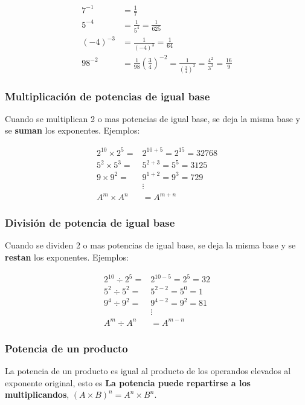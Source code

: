 \documentclass[12pt]{article}
\begin{document}
    \begin{align*}
        7^{-1} &= \frac{1}{7} \\
        5^{-4}& = \frac{1}{5^4} = \frac{1}{625} 		\\
        (-4)^{-3} &= \frac{1}{(-4)^3} = \frac{1}{64} \\
        98^{-2} &= \frac{1}{98}
        \left(\frac{3}{4} \right)^{-2} = \frac{1}{\left(\frac{3}{4} \right)^{2}} =\frac{4^2}{3^2} = \frac{16}{9}
    \end{align*}




    \subsubsection*{Multiplicación de potencias de igual base}
    Cuando se multiplican 2 o mas potencias de igual base, se deja la misma base
    y se \textbf{suman} los exponentes. Ejemplos:

    \begin{align*}
        2^{10}\times2^5 =& 2^{10+5} = 2^{15} = 32768\\
        5^2\times5^{3} =& 5^{2+3} = 5^{5} =3125\\
        9 \times 9^2 =& 9^{1+2} = 9^3 = 729 \\
        &\vdots\\
        A^m\times A^n &= A^{m+n}
    \end{align*}

    \subsubsection*{División de potencia de igual base}
    Cuando se dividen 2 o mas potencias de igual base, se deja la misma base y se
    \textbf{restan} los exponentes. Ejemplos:

    \begin{align*}
        2^{10}\div2^5 =& 2^{10-5} = 2^5 = 32\\
        5^2\div5^{2} =& 5^{2-2} = 5^{0} =1\\
        9^4 \div 9^2 =& 9^{4-2} = 9^2 = 81 \\
        &\vdots\\
        A^m\div A^n &= A^{m-n}
    \end{align*}


    \subsubsection*{Potencia de un producto}
    La potencia de un producto es igual al producto de los operandos elevados al
    exponente original, esto es
    \textbf{La potencia puede repartirse a los multiplicandos},
    $(A\times B)^{n} = A^n \times B^n $.
\end{document}
